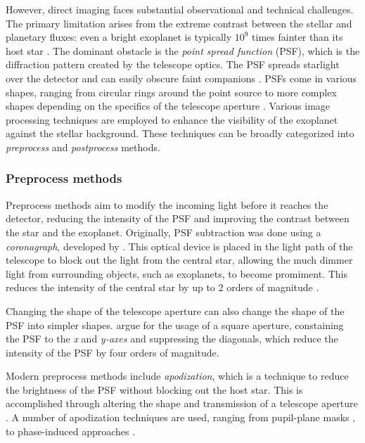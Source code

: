\documentclass[preprint,longauthor]{aastex631}
\numberwithin{equation}{section}
\begin{document}
However, direct imaging faces substantial observational and technical challenges. The primary limitation arises from the extreme contrast between the stellar and planetary fluxes: even a bright exoplanet is typically $10^{9}$ times fainter than its host star \citep{fischerExoplanetDetectionTechniques2014b}. The dominant obstacle is the \textit{point spread function} (PSF), which is the diffraction pattern created by the telescope optics. The PSF spreads starlight over the detector and can easily obscure faint companions \citep{fischerExoplanetDetectionTechniques2014b}. PSFs come in various shapes, ranging from circular rings around the point source to more complex shapes depending on the specifics of the telescope aperture \citep{fischerExoplanetDetectionTechniques2014b}. Various image processing techniques are employed to enhance the visibility of the exoplanet against the stellar background. These techniques can be broadly categorized into \textit{preprocess} and \textit{postprocess} methods.

\subsubsection{Preprocess methods}

Preprocess methods aim to modify the incoming light before it reaches the detector, reducing the intensity of the PSF and improving the contrast between the star and the exoplanet. Originally, PSF subtraction was done using a \textit{coronagraph}, developed by \citet{lyotStudySolarCorona1939}. This optical device is placed in the light path of the telescope to block out the light from the central star, allowing the much dimmer light from surrounding objects, such as exoplanets, to become promiment. This reduces the intensity of the central star by up to 2 orders of magnitude \citep{chauvinDirectImagingExoplanets2023}.

Changing the shape of the telescope aperture can also change the shape of the PSF into simpler shapes. \citet{zanoniReductionDiffractedLight1965} argue for the usage of a square aperture, constaining the PSF to the \textit{x} and \textit{y-axes} and suppressing the diagonals, which reduce the intensity of the PSF by four orders of magnitude.

Modern preprocess methods include \textit{apodization}, which is a technique to reduce the brightness of the PSF without blocking out the host star. This is accomplished through altering the shape and transmission of a telescope aperture \citep{nisensonDetectionEarthlikePlanets2001}. A number of apodization techniques are used, ranging from pupil-plane masks \citep{reddyApodizationPupilsDesign2018}, to phase-induced approaches \citep{guyonExoplanetImagingPhaseinduced2005}.
\end{document}
